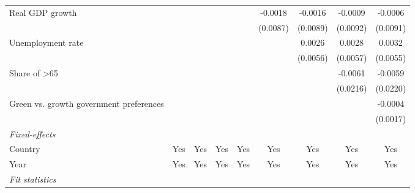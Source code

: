 \begin{table}[htbp]
\begin{tabular}{lcccccccc}
      Real GDP growth                                                 &                       &          &                 &                 & -0.0018         & -0.0016         & -0.0009         & -0.0006\\   
                                                                      &                       &          &                 &                 & (0.0087)        & (0.0089)        & (0.0092)        & (0.0091)\\   
      Unemployment rate                                               &                       &          &                 &                 &                 & 0.0026          & 0.0028          & 0.0032\\   
                                                                      &                       &          &                 &                 &                 & (0.0056)        & (0.0057)        & (0.0055)\\   
      Share of >65                                                    &                       &          &                 &                 &                 &                 & -0.0061         & -0.0059\\   
                                                                      &                       &          &                 &                 &                 &                 & (0.0216)        & (0.0220)\\   
      Green vs. growth government preferences                         &                       &          &                 &                 &                 &                 &                 & -0.0004\\   
                                                                      &                       &          &                 &                 &                 &                 &                 & (0.0017)\\   
      \midrule
      \emph{Fixed-effects}\\
      Country                                                         & Yes                   & Yes      & Yes             & Yes             & Yes             & Yes             & Yes             & Yes\\  
      Year                                                            & Yes                   & Yes      & Yes             & Yes             & Yes             & Yes             & Yes             & Yes\\  
      \midrule
      \emph{Fit statistics}\\

\end{tabular}
\end{table}
